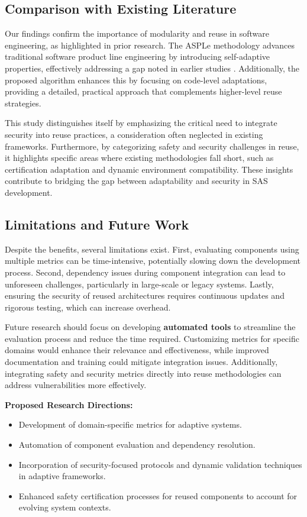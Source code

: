 \documentclass[a4paper,10pt]{article}
\begin{document}
\subsection{Comparison with Existing Literature}

Our findings confirm the importance of modularity and reuse in software engineering, as highlighted in prior research. The ASPLe methodology advances traditional software product line engineering by introducing self-adaptive properties, effectively addressing a gap noted in earlier studies \cite{Nadeem2020}. Additionally, the proposed algorithm enhances this by focusing on code-level adaptations, providing a detailed, practical approach that complements higher-level reuse strategies. 

This study distinguishes itself by emphasizing the critical need to integrate security into reuse practices, a consideration often neglected in existing frameworks. Furthermore, by categorizing safety and security challenges in reuse, it highlights specific areas where existing methodologies fall short, such as certification adaptation and dynamic environment compatibility. These insights contribute to bridging the gap between adaptability and security in SAS development.

\subsection{Limitations and Future Work}

Despite the benefits, several limitations exist. First, evaluating components using multiple metrics can be time-intensive, potentially slowing down the development process. Second, dependency issues during component integration can lead to unforeseen challenges, particularly in large-scale or legacy systems. Lastly, ensuring the security of reused architectures requires continuous updates and rigorous testing, which can increase overhead.

Future research should focus on developing \textbf{automated tools} to streamline the evaluation process and reduce the time required. Customizing metrics for specific domains would enhance their relevance and effectiveness, while improved documentation and training could mitigate integration issues. Additionally, integrating safety and security metrics directly into reuse methodologies can address vulnerabilities more effectively.

\textbf{Proposed Research Directions:}
\begin{itemize}
    \item Development of domain-specific metrics for adaptive systems.
    \item Automation of component evaluation and dependency resolution.
    \item Incorporation of security-focused protocols and dynamic validation techniques in adaptive frameworks.
    \item Enhanced safety certification processes for reused components to account for evolving system contexts.
\end{itemize}
\end{document}
